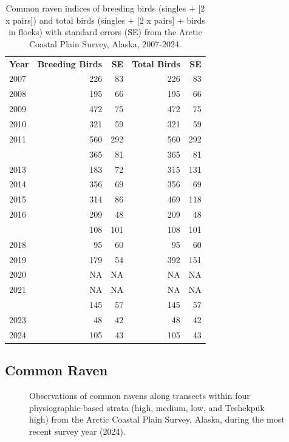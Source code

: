 \documentclass[
]{article}
\begin{document}
\begin{longtable}[t]{lrrrr}

\caption{\label{tbl-CORA}Common raven indices of breeding birds (singles
+ {[}2 x pairs{]}) and total birds (singles + {[}2 x pairs{]} + birds in
flocks) with standard errors (SE) from the Arctic Coastal Plain Survey,
Alaska, 2007-2024.}

\tabularnewline

\\
\toprule
\textbf{Year} & \textbf{Breeding Birds} & \textbf{SE} & \textbf{Total Birds} & \textbf{SE}\\
\midrule
2007 & 226 & 83 & 226 & 83\\
2008 & 195 & 66 & 195 & 66\\
2009 & 472 & 75 & 472 & 75\\
2010 & 321 & 59 & 321 & 59\\
2011 & 560 & 292 & 560 & 292\\
\addlinespace
2012 & 365 & 81 & 365 & 81\\
2013 & 183 & 72 & 315 & 131\\
2014 & 356 & 69 & 356 & 69\\
2015 & 314 & 86 & 469 & 118\\
2016 & 209 & 48 & 209 & 48\\
\addlinespace
2017 & 108 & 101 & 108 & 101\\
2018 & 95 & 60 & 95 & 60\\
2019 & 179 & 54 & 392 & 151\\
2020 & NA & NA & NA & NA\\
2021 & NA & NA & NA & NA\\
\addlinespace
2022 & 145 & 57 & 145 & 57\\
2023 & 48 & 42 & 48 & 42\\
2024 & 105 & 43 & 105 & 43\\
\bottomrule

\end{longtable}

\endgroup{}

\newpage{}

\subsection*{Common Raven}\label{common-raven-2}

\begin{figure}


\caption{\label{fig-CORAmap}Observations of common ravens along
transects within four physiographic-based strata (high, medium, low, and
Teshekpuk high) from the Arctic Coastal Plain Survey, Alaska, during the
most recent survey year (2024).}

\end{figure}%

\newpage{}
\end{document}
